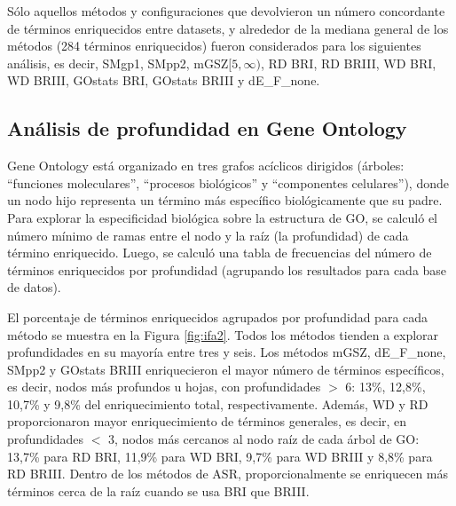 \documentclass[12pt,twoside]{reedthesis}
\begin{document}
\par

Sólo aquellos métodos y configuraciones que devolvieron un número concordante de términos enriquecidos entre datasets, y alrededor de la mediana general de los métodos (284 términos enriquecidos) fueron considerados para los siguientes análisis, es decir, SMgp1, SMpp2, mGSZ\([5,\infty)\), RD BRI, RD BRIII, WD BRI, WD BRIII, GOstats BRI, GOstats BRIII y dE\_F\_none.

\hypertarget{analisis-de-profundidad-en-gene-ontology}{%
\subsection{Análisis de profundidad en Gene Ontology}\label{analisis-de-profundidad-en-gene-ontology}}

\par

Gene Ontology está organizado en tres grafos acíclicos dirigidos (árboles: ``funciones moleculares'', ``procesos biológicos'' y ``componentes celulares''), donde un nodo hijo representa un término más específico biológicamente que su padre. Para explorar la especificidad biológica sobre la estructura de GO, se calculó el número mínimo de ramas entre el nodo y la raíz (la profundidad) de cada término enriquecido. Luego, se calculó una tabla de frecuencias del número de términos enriquecidos por profundidad (agrupando los resultados para cada base de datos).

\par

El porcentaje de términos enriquecidos agrupados por profundidad para cada método se muestra en la Figura \ref{fig:ifa2}. Todos los métodos tienden a explorar profundidades en su mayoría entre tres y seis. Los métodos mGSZ, dE\_F\_none, SMpp2 y GOstats BRIII enriquecieron el mayor número de términos específicos, es decir, nodos más profundos u hojas, con profundidades \(>\) 6: 13\%, 12,8\%, 10,7\% y 9,8\% del enriquecimiento total, respectivamente. Además, WD y RD proporcionaron mayor enriquecimiento de términos generales, es decir, en profundidades \(<\) 3, nodos más cercanos al nodo raíz de cada árbol de GO: 13,7\% para RD BRI, 11,9\% para WD BRI, 9,7\% para WD BRIII y 8,8\% para RD BRIII. Dentro de los métodos de ASR, proporcionalmente se enriquecen más términos cerca de la raíz cuando se usa BRI que BRIII.

\par
\end{document}
